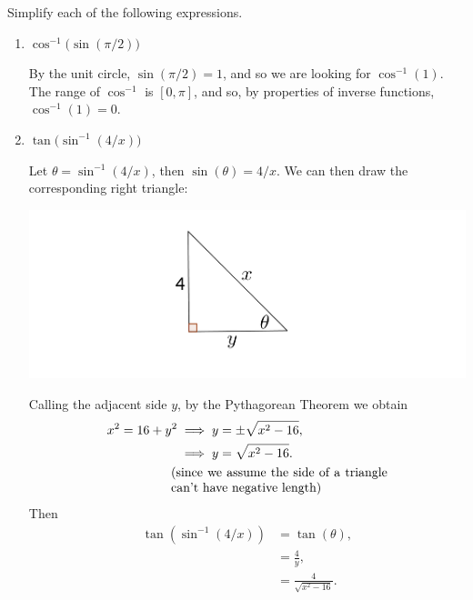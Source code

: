 \documentclass[nooutcomes]{ximera}
\begin{document}
    \begin{problem}
  Simplify each of the following expressions.
  \begin{enumerate}
    \item
      $\cos^{-1} \bigl( \sin(\pi/2) \bigr)$
      \begin{freeResponse}
        By the unit circle, $\sin(\pi/2) = 1$, and so we are looking for $\cos^{-1}(1)$.
        The range of $\cos^{-1}$ is $[0, \pi]$, and so, by properties of inverse functions, $\cos^{-1}(1) = 0$.
      \end{freeResponse}

    \item
      $\tan \bigl( \sin^{-1}(4/x ) \bigr)$
      \begin{freeResponse}
        Let $\theta = \sin^{-1}(4/x)$, then $\sin(\theta) = 4/x$.
        We can then draw the corresponding right triangle:
        \begin{image}
          \includegraphics[scale = 0.8]{figure5.png}
        \end{image}
        Calling the adjacent side $y$, by the Pythagorean Theorem we obtain
        \begin{align*}
          x^2 = 16 + y^2 &\implies y = \pm\sqrt{x^2 - 16}, \\
                         &\implies y = \sqrt{x^2 - 16}.\\
                         &\hspace{-0.5em} \mbox{\parbox[b][]{6cm}{(since we assume the side of a triangle can't have negative length)}}
        \end{align*}
        Then
        \begin{align*}
          \tan \left( \sin^{-1} \left(4/x \right) \right) &= \tan( \theta), \\
                                                                   &= \frac{4}{y}, \\
                                                                 &= \frac{4}{\sqrt{x^2 - 16}}.
        \end{align*}
      \end{freeResponse}
  \end{enumerate}
\end{problem}  
\end{document}
